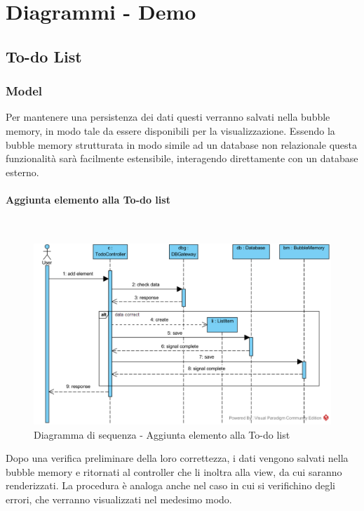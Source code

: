 \section{Diagrammi - Demo}

\subsection{To-do List}

\subsubsection{Model}
Per mantenere una persistenza dei dati questi verranno salvati nella bubble memory, in modo tale da essere disponibili per la visualizzazione. Essendo la bubble memory strutturata in modo simile ad un database non relazionale questa funzionalità sarà facilmente estensibile, interagendo direttamente con un database esterno.

\begin{samepage}
\paragraph{Aggiunta elemento alla To-do list}\mbox{}\\
\end{samepage}
\begin{figure}[H]
	\centering
	\includegraphics[width=15cm]{../../documenti/SpecificaTecnica/diagrammi/sequenza/todo_aggiungi_elemento.png}
	\caption{Diagramma di sequenza - Aggiunta elemento alla To-do list}
\end{figure}
Dopo una verifica preliminare della loro correttezza, i dati vengono salvati nella bubble memory e ritornati al controller che li inoltra alla view, da cui saranno renderizzati.
La procedura è analoga anche nel caso in cui si verifichino degli errori, che verranno visualizzati nel medesimo modo.

